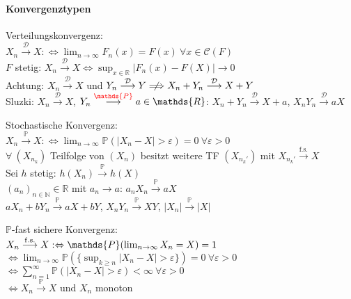 \documentclass[a4paper,draft]{article}
\newcommand{\R}{\mathds{R}}
\newcommand{\N}{\mathds{N}}
\renewcommand{\P}{\mathds{P}}
\newcommand{\D}{\mathcal{D}}
\newcommand{\parh}{\par\hangindent=0.5cm}
\newcommand{\konv}[1]{\overset{#1}{\longrightarrow}}
\newcommand{\fskonv}{\konv{\mathrm{f.s.}}}
\newcommand{\pkonv}{\konv{\P}}
\newcommand{\dkonv}{\konv{\D}}
\begin{document}
\begin{multicols}{2}
\paragraph{Konvergenztypen}\hspace{0pt}\parh
Verteilungskonvergenz:\\
$X_n \dkonv X :\Leftrightarrow \lim_{n\to \infty} F_n(x) = F(x) \: \forall x\in \mathcal{C}(F)$\\
$F$ stetig: $X_n \dkonv X \Leftrightarrow \sup_{x\in\R}|F_n(x)-F(X)|\to 0$\\
{\color{red}Achtung}: $X_n\dkonv X$ und $Y_n\dkonv Y \centernot\Longrightarrow X_n +Y_n \dkonv X+Y$\\
Sluzki: $X_n \dkonv X$, $Y_n \konv{{\color{red}\P}} a\in\R$:
$X_n+Y_n\dkonv X+a$, $X_nY_n\dkonv aX$\parh
Stochastische Konvergenz:\\
$X_n \pkonv X :\Leftrightarrow \lim_{n\to \infty} \P(|X_n - X| > \varepsilon) = 0 \: \forall \varepsilon>0$\\
$\forall\:(X_{n_k})$ Teilfolge von $(X_n)$ besitzt weitere TF $(X_{n_k'})$ mit $X_{n_k'}\fskonv X$\\
Sei $h$ stetig: $h(X_n)\pkonv h(X)$\\
$(a_n)_{n\in\N}\in\R$ mit $a_n\rightarrow a$: $a_nX_n\pkonv aX$\\
$aX_n+bY_n\pkonv aX+bY$, $X_nY_n\pkonv XY$, $|X_n|\pkonv|X|$\parh
$\P$-fast sichere Konvergenz:\\
$X_n \fskonv X :\Leftrightarrow \P(\lim_{n\to\infty} X_n=X)=1\\$
$\Leftrightarrow \lim_{n\to\infty} \P(\{\sup_{k\geq n}|X_n -X|>\varepsilon\})=0\:\forall \varepsilon>0$
$\Leftrightarrow \sum_{n=1}^\infty\P(|X_n-X|>\varepsilon)<\infty \: \forall \varepsilon>0$\\
$\Longleftrightarrow X_n\pkonv X$ und $X_n$ monoton\parh



\end{multicols}
\end{document}
